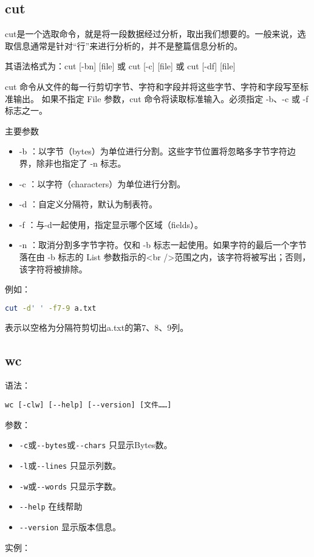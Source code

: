 \subsection{cut}
cut是一个选取命令，就是将一段数据经过分析，取出我们想要的。一般来说，选取信息通常是针对“行”来进行分析的，并不是整篇信息分析的。

其语法格式为：cut  [-bn] [file] 或 cut [-c] [file]  或  cut [-df] [file]

cut 命令从文件的每一行剪切字节、字符和字段并将这些字节、字符和字段写至标准输出。
如果不指定 File 参数，cut 命令将读取标准输入。必须指定 -b、-c 或 -f 标志之一。

主要参数
\begin{itemize}
\item
-b ：以字节（bytes）为单位进行分割。这些字节位置将忽略多字节字符边界，除非也指定了 -n 标志。
\item
-c ：以字符（characters）为单位进行分割。
\item
-d ：自定义分隔符，默认为制表符。
\item
-f  ：与-d一起使用，指定显示哪个区域（fields）。
\item
-n ：取消分割多字节字符。仅和 -b 标志一起使用。如果字符的最后一个字节落在由 -b 标志的 List 参数指示的<br />范围之内，该字符将被写出；否则，该字符将被排除。
\end{itemize}

例如：
\begin{lstlisting}[language=sh]
cut -d' ' -f7-9 a.txt
\end{lstlisting}
表示以空格为分隔符剪切出a.txt的第7、8、9列。


\subsection{wc}
语法：

\verb*|wc [-clw] [--help] [--version] [文件……]|

参数：
\begin{itemize}
\item \verb|-c|或\verb|--bytes|或\verb|--chars| 只显示Bytes数。
\item \verb|-l|或\verb|--lines| 只显示列数。
\item \verb|-w|或\verb|--words| 只显示字数。
\item \verb|--help| 在线帮助
\item \verb|--version| 显示版本信息。
\end{itemize}

实例：

